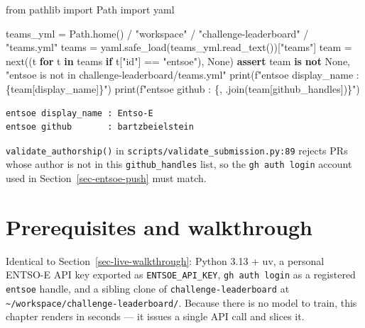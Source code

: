 \documentclass[
  english,
  letterpaper,
]{scrbook}
\newenvironment{Shaded}{\begin{snugshade}}{\end{snugshade}}
\newcommand{\BuiltInTok}[1]{\textcolor[rgb]{0.00,0.23,0.31}{#1}}
\newcommand{\ControlFlowTok}[1]{\textcolor[rgb]{0.00,0.23,0.31}{\textbf{#1}}}
\newcommand{\ImportTok}[1]{\textcolor[rgb]{0.00,0.46,0.62}{#1}}
\newcommand{\KeywordTok}[1]{\textcolor[rgb]{0.00,0.23,0.31}{\textbf{#1}}}
\newcommand{\NormalTok}[1]{\textcolor[rgb]{0.00,0.23,0.31}{#1}}
\newcommand{\OperatorTok}[1]{\textcolor[rgb]{0.37,0.37,0.37}{#1}}
\newcommand{\SpecialCharTok}[1]{\textcolor[rgb]{0.37,0.37,0.37}{#1}}
\newcommand{\SpecialStringTok}[1]{\textcolor[rgb]{0.13,0.47,0.30}{#1}}
\newcommand{\StringTok}[1]{\textcolor[rgb]{0.13,0.47,0.30}{#1}}
\newcommand{\VariableTok}[1]{\textcolor[rgb]{0.07,0.07,0.07}{#1}}
\begin{document}
\protect{}\label{entsoe-registry}
\begin{Shaded}
\begin{Highlighting}[]
\ImportTok{from}\NormalTok{ pathlib }\ImportTok{import}\NormalTok{ Path}
\ImportTok{import}\NormalTok{ yaml}

\NormalTok{teams\_yml }\OperatorTok{=}\NormalTok{ Path.home() }\OperatorTok{/} \StringTok{"workspace"} \OperatorTok{/} \StringTok{"challenge{-}leaderboard"} \OperatorTok{/} \StringTok{"teams.yml"}
\NormalTok{teams }\OperatorTok{=}\NormalTok{ yaml.safe\_load(teams\_yml.read\_text())[}\StringTok{"teams"}\NormalTok{]}
\NormalTok{team }\OperatorTok{=} \BuiltInTok{next}\NormalTok{((t }\ControlFlowTok{for}\NormalTok{ t }\KeywordTok{in}\NormalTok{ teams }\ControlFlowTok{if}\NormalTok{ t[}\StringTok{"id"}\NormalTok{] }\OperatorTok{==} \StringTok{"entsoe"}\NormalTok{), }\VariableTok{None}\NormalTok{)}
\ControlFlowTok{assert}\NormalTok{ team }\KeywordTok{is} \KeywordTok{not} \VariableTok{None}\NormalTok{, }\StringTok{"entsoe is not in challenge{-}leaderboard/teams.yml"}
\BuiltInTok{print}\NormalTok{(}\SpecialStringTok{f"entsoe display\_name : }\SpecialCharTok{\{}\NormalTok{team[}\StringTok{\textquotesingle{}display\_name\textquotesingle{}}\NormalTok{]}\SpecialCharTok{\}}\SpecialStringTok{"}\NormalTok{)}
\BuiltInTok{print}\NormalTok{(}\SpecialStringTok{f"entsoe github       : }\SpecialCharTok{\{}\StringTok{\textquotesingle{}, \textquotesingle{}}\SpecialCharTok{.}\NormalTok{join(team[}\StringTok{\textquotesingle{}github\_handles\textquotesingle{}}\NormalTok{])}\SpecialCharTok{\}}\SpecialStringTok{"}\NormalTok{)}
\end{Highlighting}
\end{Shaded}

\begin{verbatim}
entsoe display_name : Entso-E
entsoe github       : bartzbeielstein
\end{verbatim}

\texttt{validate\_authorship()} in
\texttt{scripts/validate\_submission.py:89} rejects PRs whose author is
not in this \texttt{github\_handles} list, so the
\texttt{gh\ auth\ login} account used in Section~\ref{sec-entsoe-push}
must match.

\section{Prerequisites and
walkthrough}\label{prerequisites-and-walkthrough-1}

Identical to Section~\ref{sec-live-walkthrough}: Python 3.13 + uv, a
personal ENTSO-E API key exported as \texttt{ENTSOE\_API\_KEY},
\texttt{gh\ auth\ login} as a registered \texttt{entsoe} handle, and a
sibling clone of \texttt{challenge-leaderboard} at
\texttt{\textasciitilde{}/workspace/challenge-leaderboard/}. Because
there is no model to train, this chapter renders in seconds --- it
issues a single API call and slices it.
\end{document}
